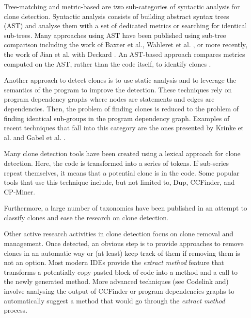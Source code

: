 Tree-matching and metric-based are two sub-categories of syntactic analysis for clone detection.
Syntactic analysis consists of building abstract syntax trees (AST) and analyse them with a set of dedicated metrics or searching for identical sub-trees.
Many approaches using AST have been published using sub-tree comparison including the work of Baxter et al.\cite{Baxter1998}, Wahleret et al. \cite{Wahler}, or more recently, the work of Jian et al. with Deckard \cite{Jiang2007}.
An AST-based approach compares metrics computed on the AST, rather than the code itself, to identify clones \cite{Patenaude1999, Balazinska}.

Another approach to detect clones is to use static analysis and to leverage the semantics of the program to improve the detection.
These techniques rely on program dependency graphs where nodes are statements and edges are dependencies.
Then, the problem of finding clones is reduced to the problem of finding identical sub-groups in the program dependency graph.
Examples of recent techniques that fall into this category are the ones presented by Krinke et al.\cite{Krinke2001} and  Gabel et al. \cite{Gabel2008}.

Many clone detection tools have been created using a lexical approach for clone detection. Here, the code is transformed into a series of tokens. If sub-series repeat themselves, it means that a potential clone is in the code. Some popular tools that use this technique include, but not limited to, Dup\cite{Baker}, CCFinder\cite{Kamiya2002}, and CP-Miner\cite{Li2006}.

Furthermore, a large number of taxonomies have been published in an attempt to classify  clones and ease the research on clone detection\cite{Mayrand1996,Balazinska1999,Koschke2006,Bellon2007,Kontogiannis,Kapser}.

Other active research activities in clone detection focus on clone removal and management. Once detected, an obvious step is to provide approaches to remove clones in an automatic way or (at least) keep track of them if removing them is not an option.
Most modern IDEs provide the \textit{extract method} feature that transforms a potentially copy-pasted block of code into a method and a call to the newly generated method\cite{Komondoor,higo2004refactoring}.
More advanced techniques (see Codelink\cite{Toomim} and\cite{Duala-Ekoko2007}) involve analysing the output of CCFinder\cite{Kamiya2002a,Livieri2007} or program dependencies graphs\cite{higo2004refactoring} to automatically suggest a method that would go through the \textit{extract method} process.

